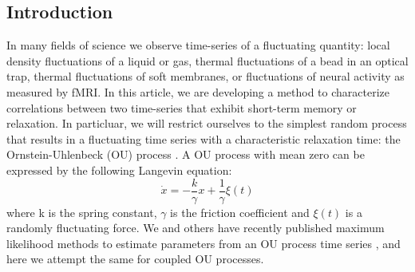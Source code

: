 \documentclass[%
 reprint,
 amsmath,amssymb,
 aps,
]{revtex4-1}
\begin{document}
\maketitle

\onecolumngrid
\subsection{Introduction}
In many fields of science we observe time-series of a fluctuating quantity: local density fluctuations of a liquid or gas, thermal fluctuations of a bead in an optical trap, thermal fluctuations of soft membranes, or fluctuations of neural activity as measured by fMRI.  In this article, we are developing a method to characterize correlations between two time-series that exhibit short-term memory or relaxation.  In particluar, we will restrict ourselves to the simplest random process that results in a fluctuating time series with a characteristic relaxation time: the Ornstein-Uhlenbeck (OU) process \cite{RN28}.  A OU process with mean zero can be expressed by the following Langevin equation:
\begin{equation}
\dot x =  - \frac{k}{\gamma }x + \frac{1}{\gamma }\xi(t)
\label{model}
\end{equation}
where k is the spring constant, $\gamma$ is the friction coefficient and $\xi(t)$ is a randomly fluctuating force.  
We and others have recently published maximum likelihood methods to estimate parameters from an OU process time series \cite{RN91,RN51,RN62}, and here we attempt the same for coupled OU processes.
\end{document}
